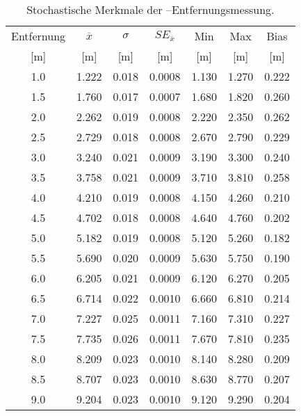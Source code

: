 \begin{appendices}

\begin{table}[h]
	\centering
	\begin{tabular}{||c||ccc||cc||c||}
\hline
Entfernung & $\overline{x}$ & $\sigma$ & $SE_{\overline{x}}$ & Min & Max & Bias \\
{[}\si{\meter}{]} & {[}\si{\meter}{]} & {[}\si{\meter}{]} & {[}\si{\meter}{]} & {[}\si{\meter}{]} & {[}\si{\meter}{]} & {[}\si{\meter}{]} \\
\hline
\hline
\num{1.0} & \num{1.222} & \num{0.018} & \num{0.0008} & \num{1.130} & \num{1.270} & \num{0.222} \\
\num{1.5} & \num{1.760} & \num{0.017} & \num{0.0007} & \num{1.680} & \num{1.820} & \num{0.260} \\
\num{2.0} & \num{2.262} & \num{0.019} & \num{0.0008} & \num{2.220} & \num{2.350} & \num{0.262} \\
\num{2.5} & \num{2.729} & \num{0.018} & \num{0.0008} & \num{2.670} & \num{2.790} & \num{0.229} \\
\num{3.0} & \num{3.240} & \num{0.021} & \num{0.0009} & \num{3.190} & \num{3.300} & \num{0.240} \\
\num{3.5} & \num{3.758} & \num{0.021} & \num{0.0009} & \num{3.710} & \num{3.810} & \num{0.258} \\
\num{4.0} & \num{4.210} & \num{0.019} & \num{0.0008} & \num{4.150} & \num{4.260} & \num{0.210} \\
\num{4.5} & \num{4.702} & \num{0.018} & \num{0.0008} & \num{4.640} & \num{4.760} & \num{0.202} \\
\num{5.0} & \num{5.182} & \num{0.019} & \num{0.0008} & \num{5.120} & \num{5.260} & \num{0.182} \\
\num{5.5} & \num{5.690} & \num{0.020} & \num{0.0009} & \num{5.630} & \num{5.750} & \num{0.190} \\
\num{6.0} & \num{6.205} & \num{0.021} & \num{0.0009} & \num{6.120} & \num{6.270} & \num{0.205} \\
\num{6.5} & \num{6.714} & \num{0.022} & \num{0.0010} & \num{6.660} & \num{6.810} & \num{0.214} \\
\num{7.0} & \num{7.227} & \num{0.025} & \num{0.0011} & \num{7.160} & \num{7.310} & \num{0.227} \\
\num{7.5} & \num{7.735} & \num{0.026} & \num{0.0011} & \num{7.670} & \num{7.810} & \num{0.235} \\
\num{8.0} & \num{8.209} & \num{0.023} & \num{0.0010} & \num{8.140} & \num{8.280} & \num{0.209} \\
\num{8.5} & \num{8.707} & \num{0.023} & \num{0.0010} & \num{8.630} & \num{8.770} & \num{0.207} \\
\num{9.0} & \num{9.204} & \num{0.023} & \num{0.0010} & \num{9.120} & \num{9.290} & \num{0.204} \\
\hline
	\end{tabular}
	\caption{Stochastische Merkmale der --Entfernungsmessung.}
	\label{tab:entfernungsmessung_2018_01_20_los}
\end{table}


\end{appendices}
